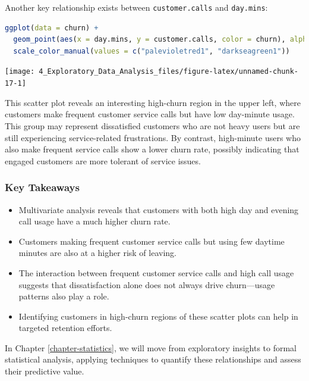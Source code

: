 \documentclass[
  11pt,
]{book}
\newcommand{\passthrough}[1]{#1}
\providecommand{\tightlist}{%
  \setlength{\itemsep}{0pt}\setlength{\parskip}{0pt}}
\theoremstyle{definition}
\theoremstyle{definition}
\theoremstyle{definition}
\theoremstyle{definition}
\theoremstyle{remark}
\begin{document}
Another key relationship exists between \passthrough{\lstinline!customer.calls!} and \passthrough{\lstinline!day.mins!}:

\begin{lstlisting}[language=R]
ggplot(data = churn) +
  geom_point(aes(x = day.mins, y = customer.calls, color = churn), alpha = 0.8) +
  scale_color_manual(values = c("palevioletred1", "darkseagreen1"))
\end{lstlisting}

\begin{center}\texttt{[image: 4\_Exploratory\_Data\_Analysis\_files/figure-latex/unnamed-chunk-17-1]} \end{center}

This scatter plot reveals an interesting high-churn region in the upper left, where customers make frequent customer service calls but have low day-minute usage. This group may represent dissatisfied customers who are not heavy users but are still experiencing service-related frustrations. By contrast, high-minute users who also make frequent service calls show a lower churn rate, possibly indicating that engaged customers are more tolerant of service issues.

\subsubsection*{Key Takeaways}\label{key-takeaways}


\begin{itemize}
\tightlist
\item
  Multivariate analysis reveals that customers with both high day and evening call usage have a much higher churn rate.
\item
  Customers making frequent customer service calls but using few daytime minutes are also at a higher risk of leaving.
\item
  The interaction between frequent customer service calls and high call usage suggests that dissatisfaction alone does not always drive churn---usage patterns also play a role.
\item
  Identifying customers in high-churn regions of these scatter plots can help in targeted retention efforts.
\end{itemize}

In Chapter \ref{chapter-statistics}, we will move from exploratory insights to formal statistical analysis, applying techniques to quantify these relationships and assess their predictive value.
\end{document}
